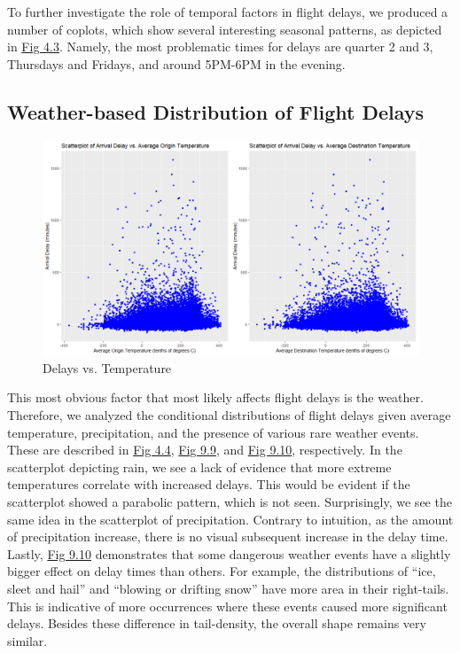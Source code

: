 \documentclass[12pt, a4paper, openany]{book}
\newcommand\tab[1][1cm]{\hspace*{#1}}
\begin{document}
	
		
	To further investigate the role of temporal factors in flight delays, we produced a number of coplots, which show several interesting seasonal patterns, as depicted in \underline{Fig 4.3}. Namely, the most problematic times for delays are quarter 2 and 3, Thursdays and Fridays, and around 5PM-6PM in the evening.\\	 
		\subsection{Weather-based Distribution of Flight Delays}
			\begin{figure}[h]
			\centering
	 		\includegraphics[width = .9 \textwidth]{../figures/PLOTS FOR REPORT/Chapter 4/Figure 4.41}
	 		\caption{Delays vs. Temperature}
	 		\end{figure}

	\tab This most obvious factor that most likely affects flight delays is the weather. Therefore, we analyzed the conditional distributions of flight delays given average temperature, precipitation, and the presence of various rare weather events. These are described in \underline{Fig 4.4}, \underline{Fig 9.9}, and \underline{Fig 9.10}, respectively. In the scatterplot depicting rain, we see a lack of evidence that more extreme temperatures correlate with increased delays. This would be evident if the scatterplot showed a parabolic pattern, which is not seen. Surprisingly, we see the same idea in the scatterplot of precipitation. Contrary to intuition, as the amount of precipitation increase, there is no visual subsequent increase in the delay time. Lastly, \underline{Fig 9.10} demonstrates that some dangerous weather events have a slightly bigger effect on delay times than others. For example, the distributions of “ice, sleet and hail” and “blowing or drifting snow” have more area in their right-tails. This is indicative of more occurrences where these events caused more significant delays. Besides these difference in tail-density, the overall shape remains very similar. \\
\end{document}
